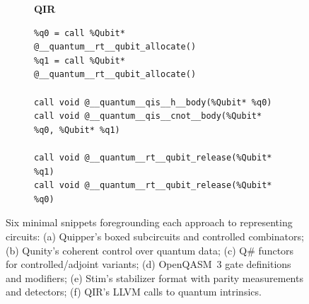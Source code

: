 \begin{figure}[p]
\vspace{2em}


\begin{subfigure}[t]{\linewidth}
\raggedright
\textbf{QIR}
\begin{verbatim}
%q0 = call %Qubit* @__quantum__rt__qubit_allocate()
%q1 = call %Qubit* @__quantum__rt__qubit_allocate()

call void @__quantum__qis__h__body(%Qubit* %q0)
call void @__quantum__qis__cnot__body(%Qubit* %q0, %Qubit* %q1)

call void @__quantum__rt__qubit_release(%Qubit* %q1)
call void @__quantum__rt__qubit_release(%Qubit* %q0)
\end{verbatim}
\end{subfigure}

\caption{
Six minimal snippets foregrounding each approach to representing circuits:
(a) Quipper’s boxed subcircuits and controlled combinators;
(b) Qunity’s coherent control over quantum data;
(c) Q\# functors for controlled/adjoint variants;
(d) OpenQASM~3 gate definitions and modifiers;
(e) Stim’s stabilizer format with parity measurements and detectors;
(f) QIR’s LLVM calls to quantum intrinsics.
}
\label{fig:lang-contrast-6}
\end{figure}
